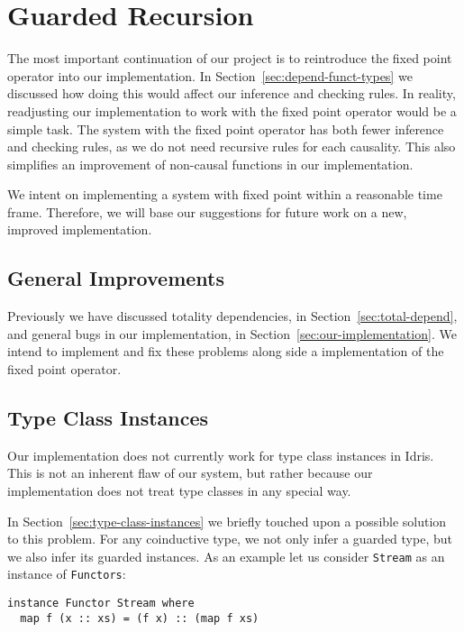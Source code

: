 % 
\section{Guarded Recursion}
\label{sec:guarded-recursion-1}
The most important continuation of our project is to reintroduce the fixed point
operator into our implementation. In Section~\ref{sec:depend-funct-types} we
discussed how doing this would affect our inference and checking rules. In
reality, readjusting our implementation to work with the fixed point operator
would be a simple task. The system with the fixed point operator has both fewer
inference and checking rules, as we do not need recursive rules for each
causality. This also simplifies an improvement of non-causal functions in our implementation.

We intent on implementing a system with fixed point within a reasonable
time frame. Therefore, we will base our suggestions for future work on a new, improved
implementation.

\subsection{General Improvements}
Previously we have discussed totality dependencies, in
Section~\ref{sec:total-depend}, and general bugs in our implementation, in
Section~\ref{sec:our-implementation}. We intend to implement and fix these
problems along side a implementation of the fixed point operator.

\subsection{Type Class Instances}
Our implementation does not currently work for type class instances in
Idris. This is not an
inherent flaw of our system, but rather because our implementation does not
treat type classes in any special way.

In Section~\ref{sec:type-class-instances} we briefly touched upon a possible
solution to this problem. For any coinductive type, we not only infer a
guarded type, but we also infer its guarded instances. As an example let us
consider \texttt{Stream} as an instance of \texttt{Functors}:

\begin{lstlisting}[mathescape, title=\idrisBlock]
instance Functor Stream where
  map f (x :: xs) = (f x) :: (map f xs)
\end{lstlisting}

